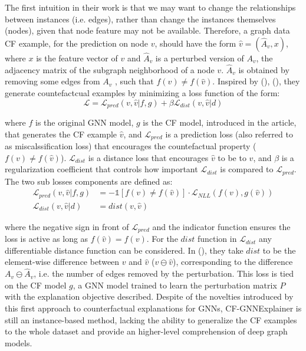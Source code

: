 \documentclass[binding=0.6cm]{sapthesis}
\newcommand{\mycite}[1]{(\cite{#1})}
\begin{document}
The first intuition in their work is that we may want to change the relationships between instances (i.e. edges), rather than change the instances themselves (nodes), given that node feature may not be available. Therefore, a graph data CF example, for the prediction on node $v$, should have the form $\hat{v} = (\hat{A}_v, x)$, where $x$ is the feature vector of $v$ and $\hat{A}_v$ is a perturbed version of $A_v$, the adjacency matrix of the subgraph neighborhood of a node $v$. $\hat{A}_v$ is obtained by removing some edges from $A_v$ , such that $f(v) \ne f(\hat{v})$. Inspired by \mycite{wachter2018-GDPR}, \mycite{lucic2022-cfgnnexplainer}, they generate countefactcual examples by minimizing a loss function of the form:
\begin{equation}
    \mathcal{L} = \mathcal{L}_{pred}(v,\hat{v}|f,g) + \beta \mathcal{L}_{dist}(v,\hat{v}|d) 
    \label{eq:cfpg.bg.cfgnn-loss}
\end{equation}

where $f$ is the original GNN model, $g$ is the CF model, introduced in the article, that generates the CF example $\hat{v}$, and $\mathcal{L}_{pred}$ is a prediction loss (also referred to as miscalssification loss) that encourages the countefactual property ($f(v) \ne f(\hat{v})$). $\mathcal{L}_{dist}$ is a distance loss that encourages $\hat{v}$ to be  to $v$, and $\beta$ is a regularization coefficient that controls how important $\mathcal{L}_{dist}$ is compared to $\mathcal{L}_{pred}$. The two sub losses components are defined as:
\begin{align}
    \mathcal{L}_{pred}(v,\hat{v}|f,g) &= -\mathbb{1}[f(v) \ne f(\hat{v})] \cdot \mathcal{L}_{NLL}(f(v),g(\hat{v})) \\
    \mathcal{L}_{dist}(v,\hat{v}|d) &= dist(v,\hat{v})
\end{align}
\label{eq:cfpg.bg.cfgnn-losses}

where the negative sign in front of $\mathcal{L}_{pred}$ and the indicator function ensures the loss is active as long as $f(\hat{v}) = f(v)$. For the $dist$ function in $\mathcal{L}_{dist}$ any differentiable distance function can be considered. In (\cite{lucic2022-cfgnnexplainer}), they take $dist$ to be the element-wise difference between $v$ and $\hat{v}$ ($v \ominus \hat{v}$), corresponding to the difference $A_v \ominus \hat{A}_v$, i.e. the number of edges removed by the perturbation. This loss is tied on the CF model $g$, a GNN model trained to learn the perturbation matrix $P$ with the explanation objective described.
Despite of the novelties introduced by this first approach to counterfactual explanations for GNNs, CF-GNNExplainer is still an instance-based method, lacking the ability to generalize the CF examples to the whole dataset and provide an higher-level comprehension of deep graph models.
\end{document}
